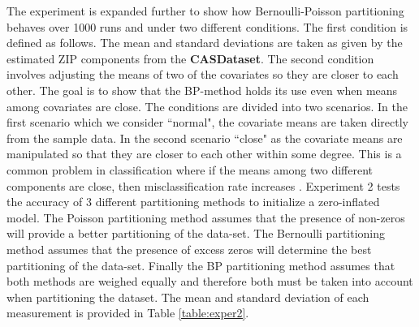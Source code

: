 \documentclass[11pt,letterpaper]{article}
\numberwithin{equation}{section}
\numberwithin{equation}{section}
\numberwithin{equation}{section}
\begin{document}
The experiment is expanded further to show how Bernoulli-Poisson partitioning behaves over 1000 runs and under two different conditions. The first condition is defined as follows. The mean and standard deviations are taken as given by the estimated  ZIP components from the \textbf{CASDataset}. The second condition involves adjusting the means of two of the covariates so they are closer to each other. The goal is to show that the BP-method holds its use even when means among covariates are close. The conditions are divided into two scenarios. In the first scenario which we consider ``normal", the covariate means are taken directly from the sample data. In the second scenario ``close" as the covariate means are manipulated so that they are closer to each other within some degree. This is a common problem in classification where if the means among two different components are close, then misclassification rate increases \citep{LimHwa}. Experiment 2 tests the accuracy of 3 different partitioning methods to initialize a zero-inflated model. The Poisson partitioning method assumes that the presence of non-zeros will provide a better partitioning of the data-set. The Bernoulli partitioning method assumes that the presence of excess zeros will determine the best partitioning of the data-set. Finally the BP partitioning method assumes that both methods are weighed equally and therefore both must be taken into account when partitioning the dataset. The mean and standard deviation of each measurement is provided in Table \ref{table:exper2}.
\end{document}
